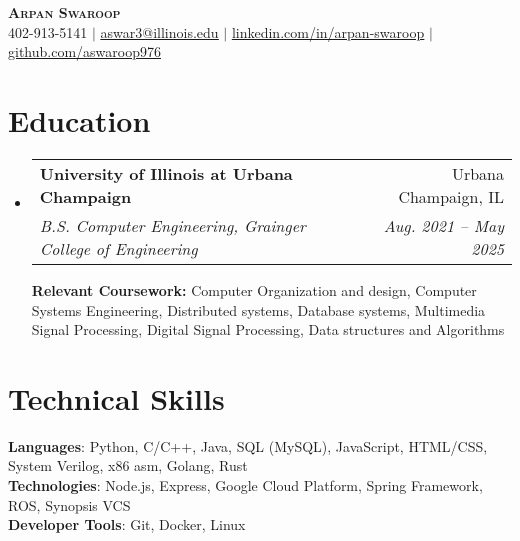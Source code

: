\documentclass[letterpaper,10pt]{article}
\makeatletter
\newcommand{\resumeSubheading}[4]{
  \vspace{-2pt}\item
    \begin{tabular*}{0.97\textwidth}[t]{l@{\extracolsep{\fill}}r}
      \textbf{#1} & #2 \\
      \textit{\small#3} & \textit{\small #4} \\
    \end{tabular*}\vspace{-7pt}
}
\newcommand{\resumeSubHeadingListStart}{\begin{itemize}[leftmargin=0.15in, label={}, itemsep=0pt]}
\newcommand{\resumeSubHeadingListEnd}{\end{itemize}}
\makeatother
\begin{document}

\begin{center}
  \textbf{\Huge \scshape Arpan Swaroop} \\ \vspace{1pt}
  \small 402-913-5141 $|$ \href{mailto:aswar3@illinois.edu}{\underline{aswar3@illinois.edu}} $|$
  \href{https://www.linkedin.com/in/arpan-swaroop-008b04256/}{\underline{linkedin.com/in/arpan-swaroop}} $|$
  \href{https://github.com/aswaroop976}{\underline{github.com/aswaroop976}}
\end{center}


\section{Education}
\resumeSubHeadingListStart
\resumeSubheading
{University of Illinois at Urbana Champaign}{Urbana Champaign, IL}
{B.S. Computer Engineering, Grainger College of Engineering}{Aug. 2021 -- May 2025}
\newline
\newline
\textbf{Relevant Coursework: }Computer Organization and design, Computer Systems Engineering, Distributed systems, Database systems, Multimedia Signal Processing, Digital Signal Processing, Data structures and Algorithms
\resumeSubHeadingListEnd
\section{Technical Skills}
\begin{itemize}[leftmargin=0.15in, label={}]
  \small{\item{
                \textbf{Languages}{: Python, C/C++, Java, SQL (MySQL), JavaScript, HTML/CSS, System Verilog, x86 asm, Golang, Rust} \\
                \textbf{Technologies}{: Node.js, Express, Google Cloud Platform, Spring Framework, ROS, Synopsis VCS} \\
                \textbf{Developer Tools}{: Git, Docker, Linux} \\
          }}
\end{itemize}
\end{document}
